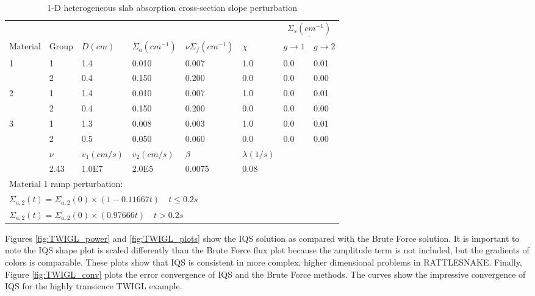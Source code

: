 \documentclass[12pt]{article}
\begin{document}
\begin{table}[!htbp]
\begin{center}
\begin{tabular}{llllllll}
\toprule
  &  &  &  &  &  &  \multicolumn{2}{c}{$\underline{\Sigma_s (cm^{-1})} $} \\
Material & Group & $D (cm)$ & $\Sigma_a (cm^{-1})$ & $\nu\Sigma_f (cm^{-1})$ & $\chi$ & $g \rightarrow 1$ & $g \rightarrow 2$ \\
\midrule
1 & 1 & 1.4 & 0.010 & 0.007 & 1.0 & 0.0 & 0.01 \\
  & 2 & 0.4 & 0.150 & 0.200 & 0.0 & 0.0 & 0.00  \\
2 & 1 & 1.4 & 0.010 & 0.007 & 1.0 & 0.0 & 0.01  \\
  & 2 & 0.4 & 0.150 & 0.200 & 0.0 & 0.0 & 0.00  \\
3 & 1 & 1.3 & 0.008 & 0.003 & 1.0 & 0.0 & 0.01  \\
  & 2 & 0.5 & 0.050 & 0.060 & 0.0 & 0.0 & 0.00  \\
\midrule
  & $\nu$ & $v_1 (cm/s)$ & $v_2 (cm/s)$ & $\beta$ & $\lambda (1/s)$ &   &   \\
\midrule
  & 2.43 & 1.0E7 & 2.0E5 & 0.0075 & 0.08 &   &   \\
\bottomrule
 \multicolumn{8}{l}{\footnotesize Material 1 ramp perturbation:} \\
\multicolumn{8}{l}{\footnotesize $\Sigma_{a,2}(t)=\Sigma_{a,2}(0) \times (1-0.11667t) \quad t \leq 0.2 s$} \\
\multicolumn{8}{l}{\footnotesize $\Sigma_{a,2}(t)=\Sigma_{a,2}(0) \times (0.97666t) \quad t > 0.2 s$} \normalsize
\end{tabular}
\end{center}
\caption{1-D heterogeneous slab absorption cross-section slope perturbation}
\label{tab:TWIGL_mat}
\end{table}

Figures \ref{fig:TWIGL_power} and \ref{fig:TWIGL_plots} show the IQS  solution as compared with the Brute Force solution.  It is important to note the IQS shape plot is scaled differently than the Brute Force flux plot because the amplitude term is not included, but the gradients of colors is comparable.  These plots show that IQS is consistent in more complex, higher dimensional problems in RATTLESNAKE.  Finally, Figure \ref{fig:TWIGL_conv} plots the error convergence of IQS and the Brute Force methods.  The curves show the impressive convergence of IQS for the highly transience TWIGL example.
\end{document}
